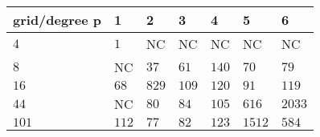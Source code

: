 \begin{tabular}{lllllll}
\hline
 grid/degree p   & 1     & 2     & 3     & 4     & 5      & 6      \\
\hline
 $4$             & $1$   & NC    & NC    & NC    & NC     & NC     \\
 $8$             & NC    & $37$  & $61$  & $140$ & $70$   & $79$   \\
 $16$            & $68$  & $829$ & $109$ & $120$ & $91$   & $119$  \\
 $44$            & NC    & $80$  & $84$  & $105$ & $616$  & $2033$ \\
 $101$           & $112$ & $77$  & $82$  & $123$ & $1512$ & $584$  \\
\hline
\end{tabular}